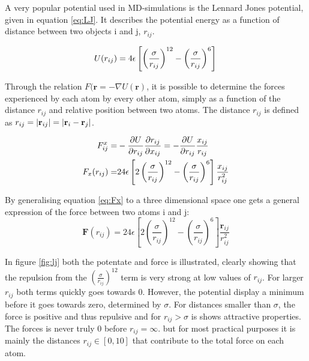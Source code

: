 A very popular potential used in MD-simulations is the Lennard Jones potential, given in equation \ref{eq:LJ}. It describes the potential energy as a function of distance between two objects i and j, $ r_{ij} $. 

\begin{equation}\label{eq:LJ}
	U(r_{ij}) = 4\epsilon \left[	\left(\frac{\sigma}{r_{ij}}	\right)^{12}		- \left(\frac{\sigma}{r_{ij}}	\right)^{6}				\right]\\
\end{equation}




Through the relation $ 	F (\textbf{r} = -\nabla U(\textbf{r}) $, it is possible to determine the forces experienced by each atom by every other atom, simply as a function of the distance $ r_{ij} $ and relative position between two atoms. The distance $ r_{ij} $ is defined as  $ r_{ij}  = \abs{\textbf{r}_{ij}} = \abs{\textbf{r}_i - \textbf{r}_j} 	 $. 

\begin{align}
		F_{ij}^x =& - \pdv{U}{r_{ij}} \pdv{r_{ij}}{x_{ij}} = - \pdv{U}{r_{ij}} \frac{x_{ij}}{r_{ij}}	\\	
		 F_x(r_{ij}) =& 24 \epsilon \left[		2	\left(\frac{\sigma}{r_{ij}}	\right)^{12}		- \left(\frac{\sigma}{r_{ij}}	\right)^{6}				\right] \frac{x_{ij}}{r_{ij}^2} \label{eq:Fx}
\end{align}

By generalising equation \ref{eq:Fx} to a three dimensional space one gets a general expression of the force between two atoms i and j: 
\begin{equation}\label{eq:F}
		  \textbf{F}(r_{ij}) = 24 \epsilon \left[		2	\left(\frac{\sigma}{r_{ij}}	\right)^{12}		- \left(\frac{\sigma}{r_{ij}}	\right)^{6}				\right] \frac{\textbf{r}_{ij}}{r_{ij}^2}
\end{equation}

In figure \ref{fig:lj} both the potentate and force is illustrated, clearly showing that the repulsion from the $ \left(	\frac{\sigma}{r_{ij}}\right)^{12} $ term is very strong at low values of $ r_{ij}$. For larger $ r_{ij} $ both terms quickly goes towards 0. However, the potential display a minimum before it goes towards zero, determined by $ \sigma $. For distances smaller than $ \sigma $, the force is positive and thus repulsive and for $ r_{ij} >\sigma $ is shows attractive properties. The forces is never truly 0 before $ r_{ij}  = \infty$. but for most practical purposes it is mainly the distances $ r_{ij} \in [0,10] $ that contribute to the total force on each atom. 


